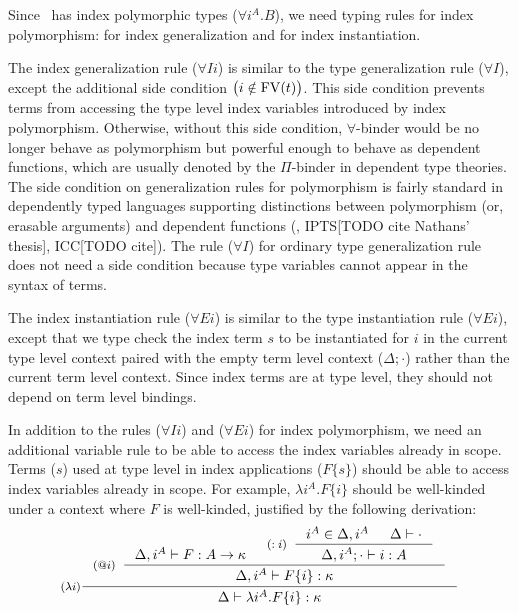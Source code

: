 Since \Fi\ has index polymorphic types ($\forall i^A . B$),
we need typing rules for index polymorphism:
 for index generalization
and  for index instantiation.

The index generalization rule ($\forall I i$) is similar to
the type generalization rule ($\forall I$), except the additional
side condition $\big(i\notin\mathop{\mathrm{FV}}(t)\big)$. This side condition prevents
terms from accessing the type level index variables introduced by index
polymorphism. Otherwise, without this side condition, $\forall$-binder
would be no longer behave as polymorphism but powerful enough to behave as
dependent functions, which are usually denoted by the $\Pi$-binder in
dependent type theories. The side condition on generalization rules
for polymorphism is fairly standard in dependently typed languages supporting
distinctions between polymorphism (or, erasable arguments) and
dependent functions (\eg, IPTS[TODO cite Nathans' thesis], ICC[TODO cite]).
The rule ($\forall I$) for ordinary type generalization rule does not need
a side condition because type variables cannot appear in the syntax of terms.

The index instantiation rule ($\forall E i$) is similar to
the type instantiation rule ($\forall E i$), except that
we type check the index term $s$ to be instantiated for $i$
in the current type level context paired with the empty term level context
($\Delta;\cdot$) rather than the current term level context.
Since index terms are at type level, they should not depend on
term level bindings.

In addition to the rules ($\forall I i$) and ($\forall E i$) for
index polymorphism, we need an additional variable rule 
to be able to access the index variables already in scope. Terms ($s$) used
at type level in index applications ($F\{s\}$) should be able to access
index variables already in scope. For example, $\lambda i^A.F\{i\}$ should be
well-kinded under a context where $F$ is well-kinded,
justified by the following derivation:
\[ \inference[($\lambda i$)]
      { \inference[($@i$)]{ \Delta, i^A |- F : A -> \kappa
                          & \inference[($:i$)]{ i^A\in \Delta,i^A
                                              & \Delta |- \cdot }
                                              {\Delta,i^A;\cdot |- i:A}
                          }
                          {\Delta, i^A |- F\{i\} : \kappa} }
      {\Delta |- \lambda i^A.F\{i\} :\kappa}
\]



